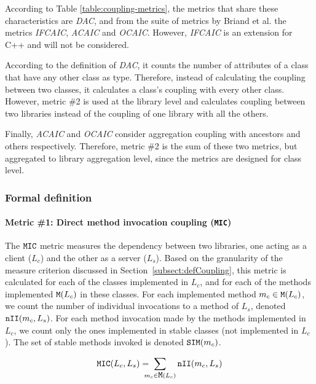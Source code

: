According to Table \ref{table:coupling-metrics}, the metrics that share these characteristics are \textit{DAC}, and from the suite of metrics by Briand et al. \cite{briand1997investigation} the metrics \textit{IFCAIC}, \textit{ACAIC} and \textit{OCAIC}. However, \textit{IFCAIC} is an extension for C++ and will not be considered.

According to the definition of \textit{DAC}, it counts the number of attributes of a class that have any other class as type. Therefore, instead of calculating the coupling between two classes, it calculates a class's coupling with every other class. However, metric \#2 is used at the library level and calculates coupling between two libraries instead of the coupling of one library with all the others.

Finally, \textit{ACAIC} and \textit{OCAIC} consider aggregation coupling with ancestors and others respectively. Therefore, metric  \#2 is the sum of these two metrics, but aggregated to library aggregation level, since the metrics are designed for class level.

\subsubsection{Formal definition}\label{subsec:metric-definition}

\paragraph{Metric \#1: Direct method invocation coupling (\texttt{MIC})}
The $\verb|MIC|$ metric measures the dependency between two libraries, one acting as a client ($L_c$) and the other as a server ($L_s$).
Based on the granularity of the measure criterion discussed in Section~\ref{subsect:defCoupling}, this metric is calculated for each of the classes implemented in $L_c$, and for each of the methods implemented $\verb|M|(L_c)$ in these classes. For each implemented method  $m_c \in \verb|M|(L_c)$, we count the number of individual invocations to a method of $L_s$, denoted $\verb|nII|(m_c,L_s)$. For each method invocation made by the methods implemented in $L_c$, we count only the ones implemented in stable classes (not implemented in $L_c$). The set of stable methods invoked is denoted $\verb|SIM|(m_c)$.

\begin{equation}
\label{eqn:mic}
\verb|MIC|(L_c, L_s) =\!\!\!\!\! \sum_{m_c \in \verb|M|(L_c)} \verb|nII|(m_c, L_s)
\end{equation}

